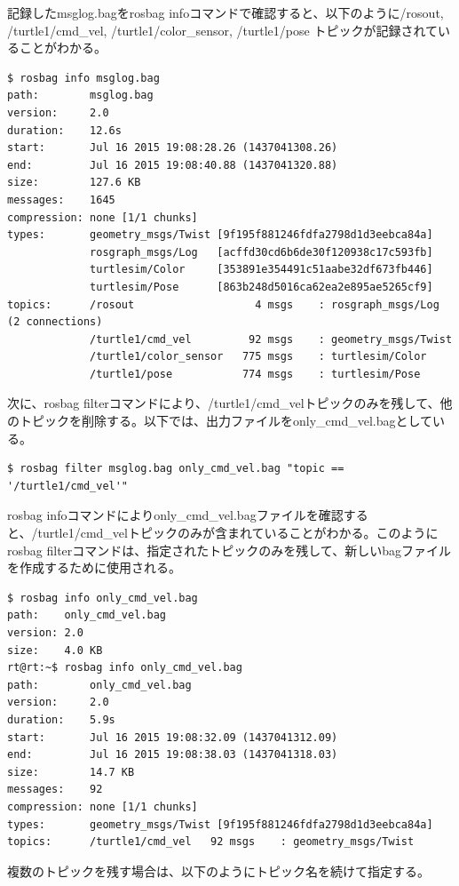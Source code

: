 記録したmsglog.bagをrosbag infoコマンドで確認すると、以下のように/rosout, /turtle1/cmd\_vel, /turtle1/color\_sensor, /turtle1/pose トピックが記録されていることがわかる。

\begin{lstlisting}[language=ROS]
$ rosbag info msglog.bag
path:        msglog.bag
version:     2.0
duration:    12.6s
start:       Jul 16 2015 19:08:28.26 (1437041308.26)
end:         Jul 16 2015 19:08:40.88 (1437041320.88)
size:        127.6 KB
messages:    1645
compression: none [1/1 chunks]
types:       geometry_msgs/Twist [9f195f881246fdfa2798d1d3eebca84a]
             rosgraph_msgs/Log   [acffd30cd6b6de30f120938c17c593fb]
             turtlesim/Color     [353891e354491c51aabe32df673fb446]
             turtlesim/Pose      [863b248d5016ca62ea2e895ae5265cf9]
topics:      /rosout                   4 msgs    : rosgraph_msgs/Log   (2 connections)
             /turtle1/cmd_vel         92 msgs    : geometry_msgs/Twist
             /turtle1/color_sensor   775 msgs    : turtlesim/Color
             /turtle1/pose           774 msgs    : turtlesim/Pose
\end{lstlisting}

次に、rosbag filterコマンドにより、/turtle1/cmd\_velトピックのみを残して、他のトピックを削除する。以下では、出力ファイルをonly\_cmd\_vel.bagとしている。

\begin{lstlisting}[language=ROS]
$ rosbag filter msglog.bag only_cmd_vel.bag "topic == '/turtle1/cmd_vel'"
\end{lstlisting}

rosbag infoコマンドによりonly\_cmd\_vel.bagファイルを確認すると、/turtle1/cmd\_velトピックのみが含まれていることがわかる。このようにrosbag filterコマンドは、指定されたトピックのみを残して、新しいbagファイルを作成するために使用される。

\begin{lstlisting}[language=ROS]
$ rosbag info only_cmd_vel.bag
path:    only_cmd_vel.bag
version: 2.0
size:    4.0 KB
rt@rt:~$ rosbag info only_cmd_vel.bag
path:        only_cmd_vel.bag
version:     2.0
duration:    5.9s
start:       Jul 16 2015 19:08:32.09 (1437041312.09)
end:         Jul 16 2015 19:08:38.03 (1437041318.03)
size:        14.7 KB
messages:    92
compression: none [1/1 chunks]
types:       geometry_msgs/Twist [9f195f881246fdfa2798d1d3eebca84a]
topics:      /turtle1/cmd_vel   92 msgs    : geometry_msgs/Twist
\end{lstlisting}

複数のトピックを残す場合は、以下のようにトピック名を続けて指定する。

